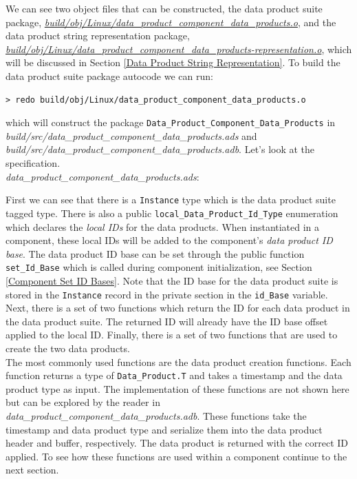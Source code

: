 We can see two object files that can be constructed, the data product suite package, \textit{\url{build/obj/Linux/data\_product\_component\_data\_products.o}}, and the data product string representation package, \textit{\url{build/obj/Linux/data\_product\_component\_data\_products-representation.o}}, which will be discussed in Section \ref{Data Product String Representation}. To build the data product suite package autocode we can run:

\vspace{5mm} %
\begin{verbatim}
> redo build/obj/Linux/data_product_component_data_products.o
\end{verbatim}
\vspace{5mm} %

which will construct the package \texttt{Data\_Product\_Component\_Data\_Products} in \textit{build/src/data\_product\_component\_data\_products.ads} and \textit{build/src/data\_product\_component\_data\_products.adb}. Let's look at the specification. \\

\textit{data\_product\_component\_data\_products.ads}:

First we can see that there is a \texttt{Instance} type which is the data product suite tagged type. There is also a public \texttt{local\_Data\_Product\_Id\_Type} enumeration which declares the \textit{local IDs} for the data products. When instantiated in a component, these local IDs will be added to the component's \textit{data product ID base}. The data product ID base can be set through the public function \texttt{set\_Id\_Base} which is called during component initialization, see Section \ref{Component Set ID Bases}. Note that the ID base for the data product suite is stored in the \texttt{Instance} record in the private section in the \texttt{id\_Base} variable. Next, there is a set of two functions which return the ID for each data product in the data product suite. The returned ID will already have the ID base offset applied to the local ID. Finally, there is a set of two functions that are used to create the two data products. \\

The most commonly used functions are the data product creation functions. Each function returns a type of \texttt{Data\_Product.T} and takes a timestamp and the data product type as input. The implementation of these functions are not shown here but can be explored by the reader in \textit{data\_product\_component\_data\_products.adb}. These functions take the timestamp and data product type and serialize them into the data product header and buffer, respectively. The data product is returned with the correct ID applied. To see how these functions are used within a component continue to the next section.


